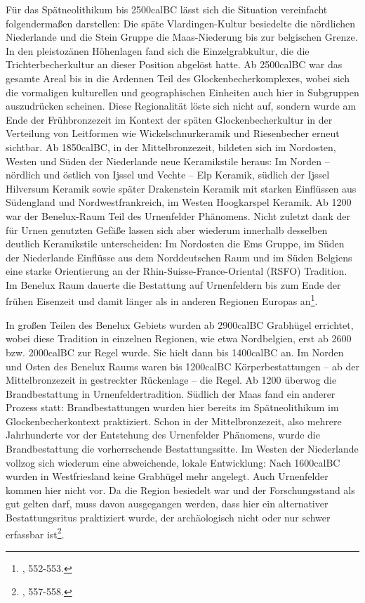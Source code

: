 \documentclass[openany,twoside,twocolumn]{book}
\let\rmarkdownfootnote\footnote%
\def\footnote{\protect\rmarkdownfootnote}
\begin{document}
Für das Spätneolithikum bis 2500calBC lässt sich die Situation vereinfacht folgendermaßen darstellen: Die späte Vlardingen-Kultur besiedelte die nördlichen Niederlande und die Stein Gruppe die Maas-Niederung bis zur belgischen Grenze. In den pleistozänen Höhenlagen fand sich die Einzelgrabkultur, die die Trichterbecherkultur an dieser Position abgelöst hatte. Ab 2500calBC war das gesamte Areal bis in die Ardennen Teil des Glockenbecherkomplexes, wobei sich die vormaligen kulturellen und geographischen Einheiten auch hier in Subgruppen auszudrücken scheinen. Diese Regionalität löste sich nicht auf, sondern wurde am Ende der Frühbronzezeit im Kontext der späten Glockenbecherkultur in der Verteilung von Leitformen wie Wickelschnurkeramik und Riesenbecher erneut sichtbar. Ab 1850calBC, in der Mittelbronzezeit, bildeten sich im Nordosten, Westen und Süden der Niederlande neue Keramikstile heraus: Im Norden -- nördlich und östlich von Ijssel und Vechte -- Elp Keramik, südlich der Ijssel Hilversum Keramik sowie später Drakenstein Keramik mit starken Einflüssen aus Südengland und Nordwestfrankreich, im Westen Hoogkarspel Keramik. Ab 1200 war der Benelux-Raum Teil des Urnenfelder Phänomens. Nicht zuletzt dank der für Urnen genutzten Gefäße lassen sich aber wiederum innerhalb desselben deutlich Keramikstile unterscheiden: Im Nordosten die Ems Gruppe, im Süden der Niederlande Einflüsse aus dem Norddeutschen Raum und im Süden Belgiens eine starke Orientierung an der Rhin-Suisse-France-Oriental (RSFO) Tradition. Im Benelux Raum dauerte die Bestattung auf Urnenfeldern bis zum Ende der frühen Eisenzeit und damit länger als in anderen Regionen Europas an\footnote{\textcite{fokkens_bronze_2013}, 552-553.}.

In großen Teilen des Benelux Gebiets wurden ab 2900calBC Grabhügel errichtet, wobei diese Tradition in einzelnen Regionen, wie etwa Nordbelgien, erst ab 2600 bzw. 2000calBC zur Regel wurde. Sie hielt dann bis 1400calBC an. Im Norden und Osten des Benelux Raums waren bis 1200calBC Körperbestattungen -- ab der Mittelbronzezeit in gestreckter Rückenlage -- die Regel. Ab 1200 überwog die Brandbestattung in Urnenfeldertradition. Südlich der Maas fand ein anderer Prozess statt: Brandbestattungen wurden hier bereits im Spätneolithikum im Glockenbecherkontext praktiziert. Schon in der Mittelbronzezeit, also mehrere Jahrhunderte vor der Entstehung des Urnenfelder Phänomens, wurde die Brandbestattung die vorherrschende Bestattungssitte. Im Westen der Niederlande vollzog sich wiederum eine abweichende, lokale Entwicklung: Nach 1600calBC wurden in Westfriesland keine Grabhügel mehr angelegt. Auch Urnenfelder kommen hier nicht vor. Da die Region besiedelt war und der Forschungsstand als gut gelten darf, muss davon ausgegangen werden, dass hier ein alternativer Bestattungsritus praktiziert wurde, der archäologisch nicht oder nur schwer erfassbar ist\footnote{\textcite{fokkens_bronze_2013}, 557-558.}.
\end{document}
